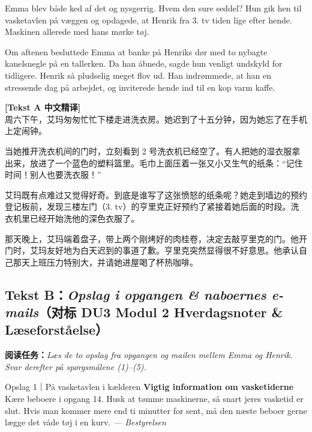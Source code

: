 Emma blev både ked af det og nysgerrig. Hvem  den sure seddel? Hun gik hen til vasketavlen på væggen og opdagede, at Henrik fra 3. tv  tiden lige efter hende. Maskinen  allerede  med hans mørke tøj.

Om aftenen besluttede Emma at banke på Henriks dør med to nybagte kanelsnegle på en tallerken. Da han åbnede, sagde hun venligt undskyld for tidligere. Henrik så pludselig meget flov ud. Han indrømmede, at han  en stressende dag på arbejdet, og inviterede hende ind til en kop varm kaffe.

\begin{transbox}
\small
\textbf{\color{NCDTeal}[Tekst A 中文精译]}\\
周六下午，艾玛匆匆忙忙下楼走进洗衣房。她迟到了十五分钟，因为她忘了在手机上定闹钟。

当她推开洗衣机间的门时，立刻看到 2 号洗衣机已经空了。有人把她的湿衣服拿出来，放进了一个蓝色的塑料篮里。毛巾上面压着一张又小又生气的纸条：“记住时间！别人也要洗衣服！”

艾玛既有点难过又觉得好奇。到底是谁写了这张愤怒的纸条呢？她走到墙边的预约登记板前，发现三楼左门（3. tv）的亨里克正好预约了紧接着她后面的时段。洗衣机里已经开始洗他的深色衣服了。

那天晚上，艾玛端着盘子，带上两个刚烤好的肉桂卷，决定去敲亨里克的门。他开门时，艾玛友好地为白天迟到的事道了歉。亨里克突然显得很不好意思。他承认自己那天上班压力特别大，并请她进屋喝了杯热咖啡。
\end{transbox}

\subsection*{Tekst B：\textit{Opslag i opgangen \& naboernes e-mails}（对标 DU3 Modul 2 Hverdagsnoter \& Læseforståelse）}

\textbf{阅读任务：}\textit{Læs de to opslag fra opgangen og mailen mellem Emma og Henrik. Svar derefter på spørgsmålene (1)--(5).}

\vspace{0.3em}
\begin{emailbox}{Opslag 1｜På vasketavlen i kælderen}
\textbf{Vigtig information om vasketiderne}\\
Kære beboere i opgang 14. Husk at tømme maskinerne, så snart jeres vasketid er slut. Hvis man kommer mere end ti minutter for sent, må den næste beboer gerne lægge det våde tøj i en kurv. \textit{--- Bestyrelsen}
\end{emailbox}


